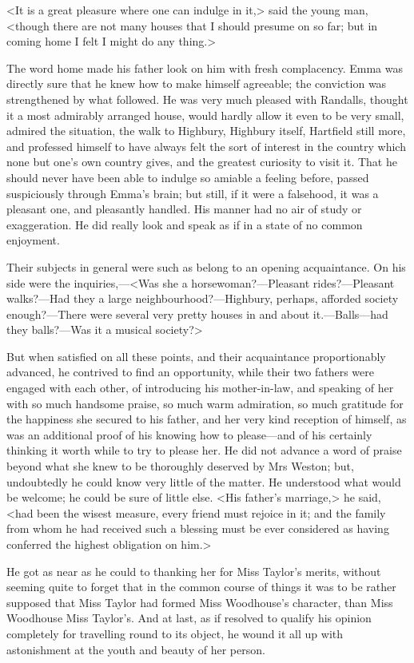 <It is a great pleasure where one can indulge in it,> said the young man, <though there are not many houses that I should presume on so far; but in coming home I felt I might do any thing.>

The word home made his father look on him with fresh complacency. Emma was directly sure that he knew how to make himself agreeable; the conviction was strengthened by what followed. He was very much pleased with Randalls, thought it a most admirably arranged house, would hardly allow it even to be very small, admired the situation, the walk to Highbury, Highbury itself, Hartfield still more, and professed himself to have always felt the sort of interest in the country which none but one's own country gives, and the greatest curiosity to visit it. That he should never have been able to indulge so amiable a feeling before, passed suspiciously through Emma's brain; but still, if it were a falsehood, it was a pleasant one, and pleasantly handled. His manner had no air of study or exaggeration. He did really look and speak as if in a state of no common enjoyment.

Their subjects in general were such as belong to an opening acquaintance. On his side were the inquiries,—<Was she a horsewoman?—Pleasant rides?—Pleasant walks?—Had they a large neighbourhood?—Highbury, perhaps, afforded society enough?—There were several very pretty houses in and about it.—Balls—had they balls?—Was it a musical society?>

But when satisfied on all these points, and their acquaintance proportionably advanced, he contrived to find an opportunity, while their two fathers were engaged with each other, of introducing his mother-in-law, and speaking of her with so much handsome praise, so much warm admiration, so much gratitude for the happiness she secured to his father, and her very kind reception of himself, as was an additional proof of his knowing how to please—and of his certainly thinking it worth while to try to please her. He did not advance a word of praise beyond what she knew to be thoroughly deserved by Mrs Weston; but, undoubtedly he could know very little of the matter. He understood what would be welcome; he could be sure of little else. <His father's marriage,> he said, <had been the wisest measure, every friend must rejoice in it; and the family from whom he had received such a blessing must be ever considered as having conferred the highest obligation on him.>

He got as near as he could to thanking her for Miss Taylor's merits, without seeming quite to forget that in the common course of things it was to be rather supposed that Miss Taylor had formed Miss Woodhouse's character, than Miss Woodhouse Miss Taylor's. And at last, as if resolved to qualify his opinion completely for travelling round to its object, he wound it all up with astonishment at the youth and beauty of her person.

